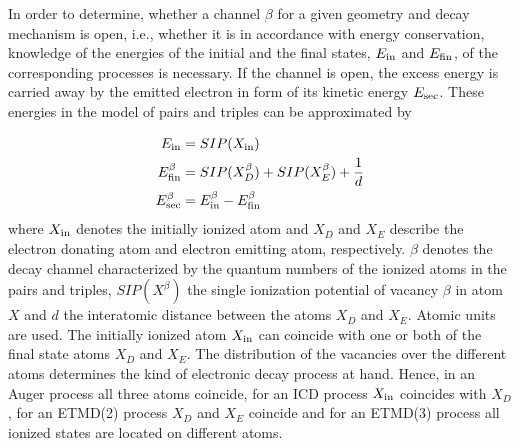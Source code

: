 
In order to determine, whether a channel $\beta$ for a given geometry and decay
mechanism is open, i.e., whether it is in accordance with energy conservation,
knowledge of the energies of the initial and the final states, $E_{\rm in}$ and $E_{\rm fin}$, of
the corresponding processes is necessary.
If the channel
is open, the excess energy is carried away by the emitted electron
in form of its kinetic energy $E_{\rm sec}$. These energies in the model
of pairs and triples can be approximated by

\begin{align}
 E_{\rm in}        &= SIP(X_{\rm in}) \label{equation:E_in}\\
 E_{\rm fin}^\beta &= SIP(X_{D}^\beta) + SIP(X_{E}^\beta) + \frac 1d
           \label{equation:E_fin}\\
 E_{\rm sec}^\beta &= E_{\rm in}^\beta - E_{\rm fin}^\beta \label{equation:E_sec}
\end{align}
where $X_{\rm in}$ denotes the initially ionized atom and
$X_{D}$ and $X_{E}$ describe the electron donating atom and electron
emitting atom, respectively.
$\beta$ denotes the decay channel characterized by the quantum numbers of the ionized atoms in the pairs and triples, $SIP(X^\beta)$ the single ionization potential of vacancy $\beta$ in atom $X$ and $d$ the interatomic distance between the atoms $X_{D}$ and $X_{E}$. 
Atomic units are used.
The initially ionized atom $X_{\rm in}$ can
coincide with one or both of
the final state atoms
$X_{D}$ and $X_{E}$.
The distribution of the vacancies over the different
atoms determines the kind of electronic decay process at hand. Hence, in an
Auger process all three atoms coincide, for an ICD process $X_{\rm in}$
coincides with $X_{D}$, for an ETMD(2) process $X_D$ and $X_E$ coincide
and for an ETMD(3) process
all ionized states are located on different atoms.

